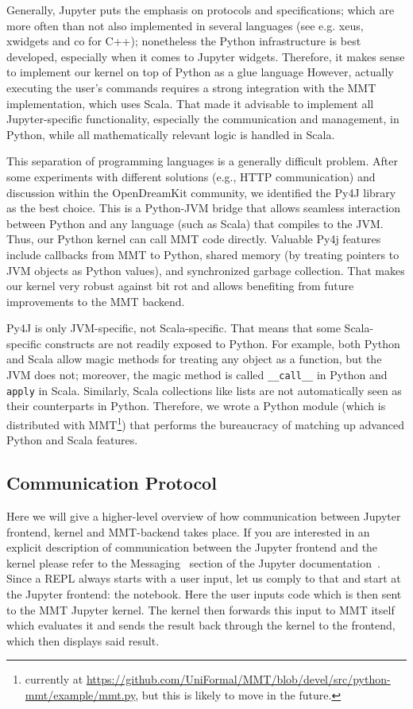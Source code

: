 Generally, Jupyter puts the emphasis on protocols and specifications; which are more often than not also implemented in several languages (see e.g. xeus, xwidgets and co for C++); nonetheless the Python infrastructure is best developed, especially when it comes to Jupyter widgets. 
Therefore, it makes sense to implement our kernel on top of  Python as a glue language
However, actually executing the user's commands requires a strong integration with the MMT implementation, which uses Scala.
That made it advisable to implement all Jupyter-specific functionality, especially the communication and management, in Python, while all mathematically relevant logic is handled in Scala.

This separation of programming languages is a generally difficult problem.
After some experiments with different solutions (e.g., HTTP communication) and discussion within the OpenDreamKit community, we identified the Py4J library~\cite{Py4J:on} as the best choice.
This is a Python-JVM bridge that allows seamless interaction between Python and any language (such as Scala) that compiles to the JVM.
Thus, our Python kernel can call MMT code directly.
Valuable Py4j features include callbacks from MMT to Python, shared memory (by treating pointers to JVM objects as Python values), and synchronized garbage collection.
That makes our kernel very robust against bit rot and allows benefiting from future improvements to the MMT backend.

Py4J is only JVM-specific, not Scala-specific.  That means that some Scala-specific constructs are not readily exposed to Python.  For example, both Python and Scala allow magic methods for treating any object as a function, but the JVM does not; moreover, the magic method is called \texttt{\_\_call\_\_} in Python and \texttt{apply} in Scala.  Similarly, Scala collections like lists are not automatically seen as their counterparts in Python.  Therefore, we wrote a Python module (which is distributed with MMT\footnote{currently at \url{https://github.com/UniFormal/MMT/blob/devel/src/python-mmt/example/mmt.py}, but this is likely to move in the future.}) that performs the bureaucracy of matching up advanced Python and Scala features.


\subsection{Communication Protocol}
Here we will give a higher-level overview of how communication between Jupyter frontend, kernel and MMT-backend takes place.
If you are interested in an explicit description of communication between the Jupyter frontend and the kernel please refer to the Messaging~\cite{JupMessaging:on} section of the Jupyter documentation~\cite{JupDocumentation:on}.
Since a REPL always starts with a user input, let us comply to that and start at the Jupyter frontend: the notebook.
Here the user inputs code which is then sent to the MMT Jupyter kernel.
The kernel then forwards this input to MMT itself which evaluates it and sends the result back through the kernel to the frontend, which then displays said result.


